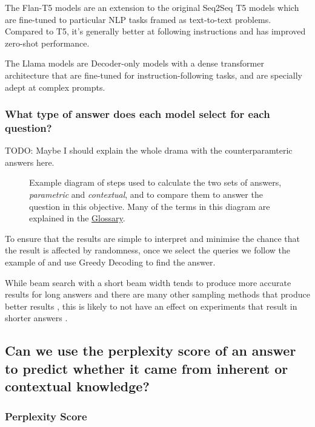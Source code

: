 The Flan-T5 models \citep{flant5} are an extension to the original Seq2Seq T5 models \citep{t5} which are fine-tuned to particular NLP tasks framed as text-to-text problems.
Compared to T5, it's generally better at following instructions and has improved zero-shot performance.

The Llama models \citep{llama3} are Decoder-only models with a dense transformer architecture that are fine-tuned for instruction-following tasks, and are specially adept at complex prompts.

\subsubsection{What type of answer does each model select for each question?}

TODO: Maybe I should explain the whole drama with the counterparamteric answers here.

\begin{figure}[h]
	\centering
	\caption{Example diagram of steps used to calculate the two sets of answers, \textit{parametric} and \textit{contextual}, and to compare them to answer the question in this objective. Many of the terms in this diagram are explained in the \hyperref[glossary]{Glossary}.}
\end{figure}

To ensure that the results are simple to interpret and minimise the chance that the result is affected by randomness, once we select the queries we follow the example of \citeauthor{ragged} and use Greedy Decoding to find the answer.

While beam search with a short beam width tends to produce more accurate results for long answers \citep{sutskever_seq2seqlearning,wu_mltranslation} and there are many other sampling methods that produce better results \citep{text_degeneration}, this is likely to not have an effect on experiments that result in shorter answers \citep{t5}.

\subsection{Can we use the perplexity score of an answer to predict whether it came from inherent or contextual knowledge?}

\subsubsection{Perplexity Score}

